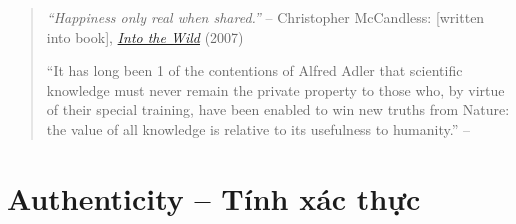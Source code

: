 \documentclass[12pt,twoside]{book}
\begin{document}
\begin{quotation}
	{\it``Happiness only real when shared.''} -- {\sc Christopher McCandless}: {\rm[written into book]}, \href{https://www.imdb.com/title/tt0758758}{\it Into the Wild} (2007)
	
	``It has long been 1 of the contentions of {\sc Alfred Adler} that scientific knowledge must never remain the private property to those who, by virtue of their special training, have been enabled to win new truths from Nature: the value of all knowledge is relative to its usefulness to humanity.'' -- \cite[Translator's Preface, p. vii]{Adler_human_nature}
\end{quotation}

\section{Authenticity -- Tính xác thực}
\end{document}
